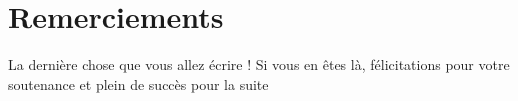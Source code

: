 \documentclass[main.tex]{subfiles}
\begin{document}
\chapter*{Remerciements}

La dernière chose que vous allez écrire ! Si vous en êtes là, félicitations pour votre soutenance et plein de succès pour la suite
\end{document}
